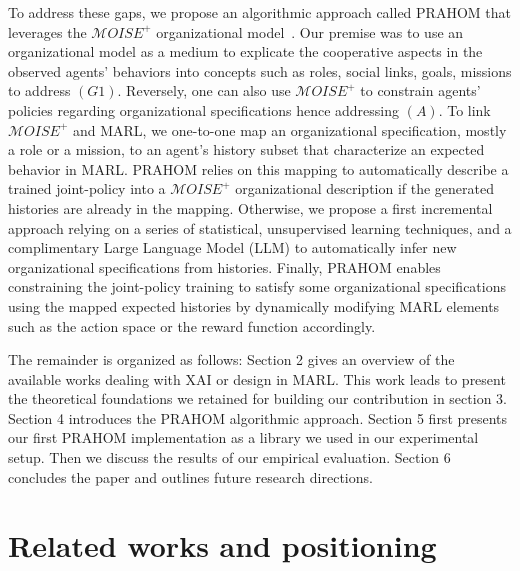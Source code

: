 \documentclass[runningheads]{llncs}
\begin{document}
To address these gaps, we propose an algorithmic approach called PRAHOM that leverages the $\mathcal{M}OISE^+$ organizational model~\cite{Hubner2007}. Our premise was to use an organizational model as a medium to explicate the cooperative aspects in the observed agents' behaviors into concepts such as roles, social links, goals, missions to address $(G1)$. Reversely, one can also use $\mathcal{M}OISE^+$ to constrain agents' policies regarding organizational specifications hence addressing $(A)$. To link $\mathcal{M}OISE^+$ and MARL, we one-to-one map an organizational specification, mostly a role or a mission, to an agent's history subset that characterize an expected behavior in MARL. PRAHOM relies on this mapping to automatically describe a trained joint-policy into a $\mathcal{M}OISE^+$ organizational description if the generated histories are already in the mapping. Otherwise, we propose a first incremental approach relying on a series of statistical, unsupervised learning techniques, and a complimentary Large Language Model (LLM) to automatically infer new organizational specifications from histories. Finally, PRAHOM enables constraining the joint-policy training to satisfy some organizational specifications using the mapped expected histories by dynamically modifying MARL elements such as the action space or the reward function accordingly.

The remainder is organized as follows: Section 2 gives an overview of the available works dealing with XAI or design in MARL. This work leads to present the theoretical foundations we retained for building our contribution in section 3. Section 4 introduces the PRAHOM algorithmic approach. Section 5 first presents our first PRAHOM implementation as a library we used in our experimental setup. Then we discuss the results of our empirical evaluation. Section 6 concludes the paper and outlines future research directions.



\section{Related works and positioning}


\end{document}
